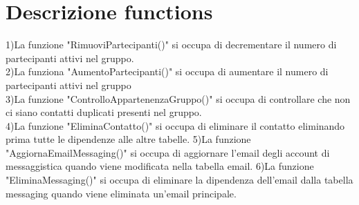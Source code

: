 \documentclass{article}
\begin{document}
    \section{\LARGE Descrizione functions}
    1)La funzione "RimuoviPartecipanti()" si occupa di decrementare il numero di partecipanti
    attivi nel gruppo.\\
    2)La funziona "AumentoPartecipanti()" si occupa di aumentare il numero di partecipanti
    attivi nel gruppo\\
    3)La funzione "ControlloAppartenenzaGruppo()" si occupa di controllare che non ci siano
    contatti duplicati presenti nel gruppo.\\
    4)La funzione "EliminaContatto()" si occupa di eliminare il contatto eliminando prima tutte 
    le dipendenze alle altre tabelle.
    5)La funzione "AggiornaEmailMessaging()" si occupa di aggiornare l'email degli account di messaggistica
    quando viene modificata nella tabella email.
    6)La funzione "EliminaMessaging()"  si occupa di eliminare la dipendenza dell'email dalla tabella
    messaging quando viene eliminata un'email principale. 
\end{document}
